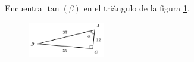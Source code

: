 \question[15] Encuentra $\tan(\beta)$ en el triángulo de la figura \ref{fig:functrig17}.
\begin{figure}[H]
    \begin{center}
        \includegraphics[width=0.3\textwidth]{../images/functrig17.png}
    \end{center}
    \caption{}
    \label{fig:functrig17}
\end{figure}
